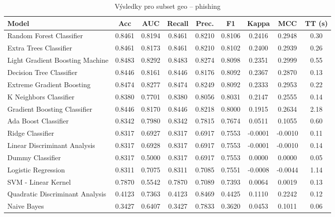 \begin{table}[H]
  \centering
  \small
  \caption{Výsledky pro subset geo – phishing}
  \begin{tabular}{|l|c|c|c|c|c|c|c|c|}
    \hline
    \textbf{Model} & \textbf{Acc} & \textbf{AUC} & \textbf{Recall} & \textbf{Prec.} & \textbf{F1} & \textbf{Kappa} & \textbf{MCC} & \textbf{TT (s)} \\
    \hline
    Random Forest Classifier & 0.8461 & 0.8194 & 0.8461 & 0.8210 & 0.8106 & 0.2416 & 0.2948 & 0.30 \\
    Extra Trees Classifier & 0.8461 & 0.8173 & 0.8461 & 0.8210 & 0.8102 & 0.2400 & 0.2939 & 0.26 \\
    Light Gradient Boosting Machine & 0.8483 & 0.8292 & 0.8483 & 0.8274 & 0.8098 & 0.2351 & 0.2999 & 0.55 \\
    Decision Tree Classifier & 0.8446 & 0.8161 & 0.8446 & 0.8176 & 0.8092 & 0.2367 & 0.2870 & 0.13 \\
    Extreme Gradient Boosting & 0.8474 & 0.8277 & 0.8474 & 0.8249 & 0.8092 & 0.2333 & 0.2953 & 0.22 \\
    K Neighbors Classifier & 0.8380 & 0.7701 & 0.8380 & 0.8056 & 0.8031 & 0.2147 & 0.2555 & 0.14 \\
    Gradient Boosting Classifier & 0.8446 & 0.8170 & 0.8446 & 0.8218 & 0.8000 & 0.1915 & 0.2634 & 2.18 \\
    Ada Boost Classifier & 0.8342 & 0.7980 & 0.8342 & 0.7815 & 0.7674 & 0.0511 & 0.1055 & 0.60 \\
    Ridge Classifier & 0.8317 & 0.6927 & 0.8317 & 0.6917 & 0.7553 & -0.0001 & -0.0010 & 0.11 \\
    Linear Discriminant Analysis & 0.8317 & 0.6928 & 0.8317 & 0.6917 & 0.7553 & -0.0001 & -0.0010 & 0.14 \\
    Dummy Classifier & 0.8317 & 0.5000 & 0.8317 & 0.6917 & 0.7553 & 0.0000 & 0.0000 & 0.05 \\
    Logistic Regression & 0.8311 & 0.7075 & 0.8311 & 0.7085 & 0.7551 & -0.0008 & -0.0044 & 1.14 \\
    SVM - Linear Kernel & 0.7870 & 0.5542 & 0.7870 & 0.7089 & 0.7393 & 0.0064 & 0.0019 & 0.13 \\
    Quadratic Discriminant Analysis & 0.4123 & 0.7363 & 0.4123 & 0.8469 & 0.4425 & 0.1110 & 0.2242 & 0.12 \\
    Naive Bayes & 0.3427 & 0.6407 & 0.3427 & 0.7833 & 0.3620 & 0.0453 & 0.1011 & 0.06 \\
    \hline
  \end{tabular}
\end{table}
\vspace{0.5cm}

